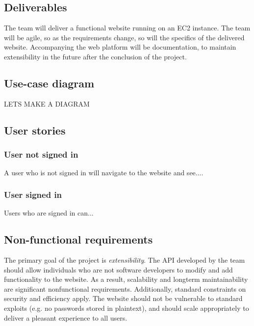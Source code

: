 \documentclass[12pt]{article}
\begin{document}
\begin{spacing}{1.5}
\subsection{Deliverables}
The team will deliver a functional website running on an EC2 instance. The team will be agile, so as the requirements change, so will the specifics of the delivered website. Accompanying the web platform will be documentation, to maintain extensibility in the future after the conclusion of the project.

\subsection{Use-case diagram}
LETS MAKE A DIAGRAM

\subsection{User stories}
\subsubsection{User not signed in}
A user who is not signed in will navigate to the website and see....
\subsubsection{User signed in}
Users who are signed in can...

\subsection{Non-functional requirements}
The primary goal of the project is \emph{extensibility}. The API developed by the team should allow individuals who are not software developers to modify and add functionality to the website. As a result, scalability and longterm maintainability are significant nonfunctional requirements. Additionally, standard constraints on security and efficiency apply. The website should not be vulnerable to standard exploits (e.g. no passwords stored in plaintext), and should scale appropriately to deliver a pleasant experience to all users.

\newpage


\end{spacing}
\end{document}
